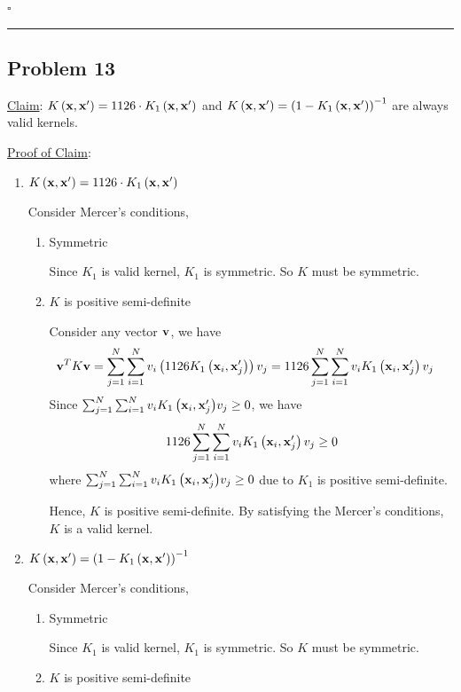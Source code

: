 \documentclass[12pt]{article}
\newcommand*{\QEDB}{\hfill\ensuremath{\square}}
\newcommand{\ParTh}[1]{\left(#1\right)}
\newcommand{\BF}[1]{{\bf#1}}
\newcommand{\horrule}[1]{\rule{\linewidth}{#1}}
\begin{document}
\QEDB

\horrule{0.5pt}

\subsection*{Problem 13}

\underline{Claim}: $K\ParTh{\BF{x},\BF{x}^\prime}=1126\cdot K_1\ParTh{\BF{x},\BF{x}^\prime}$ and $K\ParTh{\BF{x},\BF{x}^\prime}=\ParTh{1-{K_1\ParTh{\BF{x},\BF{x}^\prime}}}^{-1}$ are always valid kernels.

\underline{Proof of Claim}:

\begin{enumerate}
	\item $K\ParTh{\BF{x},\BF{x}^\prime}=1126\cdot K_1\ParTh{\BF{x},\BF{x}^\prime}$
	
	Consider Mercer's conditions,
	\begin{enumerate}
		\item Symmetric
		
		Since $K_1$ is valid kernel, $K_1$ is symmetric. So $K$ must be symmetric.
		\item $K$ is positive semi-definite
		
		Consider any vector $\BF{v}$, we have
		\begin{align}
		\BF{v}^TK\BF{v}&=\sum_{j=1}^{N}\sum_{i=1}^{N}v_i\ParTh{1126K_1\ParTh{\BF{x}_i,\BF{x}^\prime_j}}v_j=1126\sum_{j=1}^{N}\sum_{i=1}^{N}v_iK_1\ParTh{\BF{x}_i,\BF{x}^\prime_j}v_j
		\end{align}
		Since $\sum_{j=1}^{N}\sum_{i=1}^{N}v_i{K_1\ParTh{\BF{x}_i,\BF{x}^\prime_j}}v_j\geq0$, we have
		\begin{align}
		1126\sum_{j=1}^{N}\sum_{i=1}^{N}v_iK_1\ParTh{\BF{x}_i,\BF{x}^\prime_j}v_j\geq0
		\end{align}
		where $\sum_{j=1}^{N}\sum_{i=1}^{N}v_i{K_1\ParTh{\BF{x}_i,\BF{x}^\prime_j}}v_j\geq0$ due to $K_1$ is positive semi-definite.
		
		Hence, $K$ is positive semi-definite.
		By satisfying the Mercer's conditions, $K$ is a valid kernel.
	\end{enumerate}
	\item $K\ParTh{\BF{x},\BF{x}^\prime}=\ParTh{1-{K_1\ParTh{\BF{x},\BF{x}^\prime}}}^{-1}$
	
	Consider Mercer's conditions,
\begin{enumerate}
	\item Symmetric
	
	Since $K_1$ is valid kernel, $K_1$ is symmetric. So $K$ must be symmetric.
	\item $K$ is positive semi-definite
	

\end{enumerate}
\end{enumerate}
\end{document}
